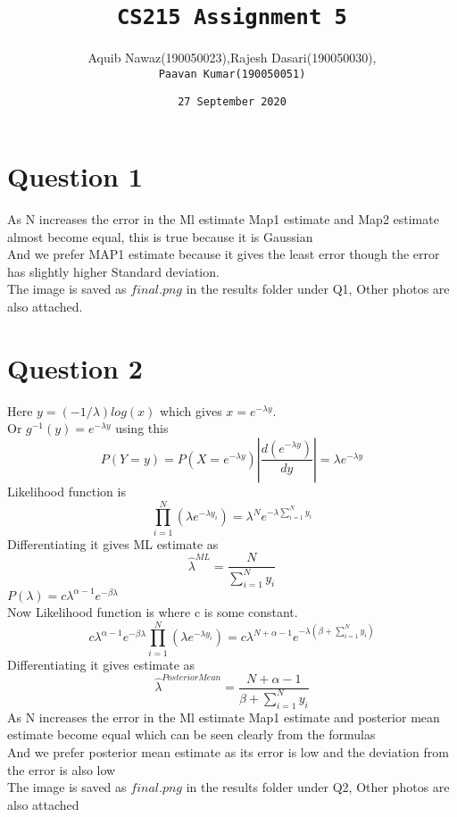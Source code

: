 \documentclass{article}
\title{\huge\texttt{CS215 Assignment 5}}
\author{Aquib Nawaz(190050023),Rajesh Dasari(190050030),\\\texttt{Paavan Kumar(190050051)}}
\date{\texttt{27 September 2020}}
\begin{document}
\maketitle
\section*{Question 1}
As N increases the error in the Ml estimate Map1 estimate and Map2 estimate almost become equal, this is true because it is Gaussian\\
And we prefer MAP1 estimate because it gives the least error though the error has slightly higher Standard deviation.\\
The image is saved as $final.png$ in the results folder under Q1, Other photos are also attached.
\section*{Question 2}
Here $y = (-1/\lambda)log(x)$  which gives $x = e^{-\lambda y }$.\\
Or $g^{-1}(y) = e^{-\lambda y }$ using this
\begin{equation*}
    P(Y = y) = P(X = e^{-\lambda y })|\frac{d(e^{-\lambda y })}{dy}| = \lambda e^{-\lambda y }
\end{equation*}
Likelihood function is 
\begin{equation*}
    \prod_{i=1}^N(\lambda e^{-\lambda y_i}) = \lambda^N e^{-\lambda\sum_{i=1}^N y_i}
\end{equation*}
Differentiating it gives ML estimate as
\begin{equation*}
\hat{\lambda}^{ML} = \frac{N}{\sum_{i=1}^{N}y_i}    
\end{equation*}
  $P(\lambda) = c \lambda^{\alpha-1} e^{-\beta \lambda}$\\
Now Likelihood function is where c is some constant.
\begin{equation*}
    c \lambda^{\alpha-1} e^{-\beta \lambda}\prod_{i=1}^N(\lambda e^{-\lambda y_i}) = c\lambda^{N+\alpha - 1} e^{-\lambda(\beta + \sum_{i=1}^N y_i)}
\end{equation*}
Differentiating it gives estimate as
\begin{equation*}
\hat{\lambda}^{PosteriorMean} = \frac{N+\alpha-1}{\beta + \sum_{i=1}^{N}y_i}
\end{equation*}
As N increases the error in the Ml estimate Map1 estimate and posterior mean estimate become equal which can be seen clearly from the formulas\\
And we prefer posterior mean estimate as its error is low and the deviation from the error is also low\\
The image is saved as $final.png$ in the results folder under Q2, Other photos are also attached
\end{document}

